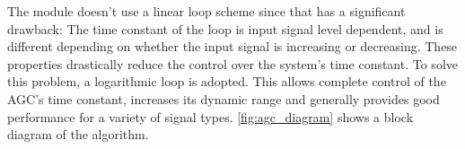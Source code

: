 The module doesn't use a linear loop scheme since that has a significant drawback: The time constant of the loop is input signal level dependent, and is different depending on whether the input signal is increasing or decreasing. These properties drastically reduce the control over the system's time constant. To solve this problem, a logarithmic loop is adopted. This allows complete control of the AGC's time constant, increases its dynamic range and generally provides good performance for a variety of signal types. \autoref{fig:agc_diagram} shows a block diagram of the algorithm.



